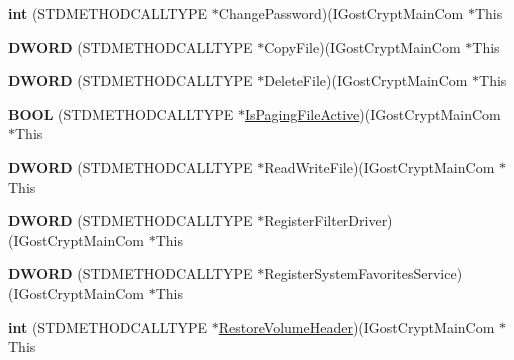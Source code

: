 \begin{DoxyCompactItemize}
{\bfseries int} (S\+T\+D\+M\+E\+T\+H\+O\+D\+C\+A\+L\+L\+T\+Y\+PE $\ast$Change\+Password)(I\+Gost\+Crypt\+Main\+Com $\ast$This
\item 
\mbox{\label{struct_i_gost_crypt_main_com_vtbl_a213c1d206762606814a94a75a89e5355}} 
{\bfseries D\+W\+O\+RD} (S\+T\+D\+M\+E\+T\+H\+O\+D\+C\+A\+L\+L\+T\+Y\+PE $\ast$Copy\+File)(I\+Gost\+Crypt\+Main\+Com $\ast$This
\item 
\mbox{\label{struct_i_gost_crypt_main_com_vtbl_a902bda4ac17a6bae0eb9a6160a0cc954}} 
{\bfseries D\+W\+O\+RD} (S\+T\+D\+M\+E\+T\+H\+O\+D\+C\+A\+L\+L\+T\+Y\+PE $\ast$Delete\+File)(I\+Gost\+Crypt\+Main\+Com $\ast$This
\item 
\mbox{\label{struct_i_gost_crypt_main_com_vtbl_a66d49597b936e6bbc66a2c908420f16e}} 
{\bfseries B\+O\+OL} (S\+T\+D\+M\+E\+T\+H\+O\+D\+C\+A\+L\+L\+T\+Y\+PE $\ast$\hyperlink{_dlgcode_8c_a4683f63544f31aee5130df039402b772}{Is\+Paging\+File\+Active})(I\+Gost\+Crypt\+Main\+Com $\ast$This
\item 
\mbox{\label{struct_i_gost_crypt_main_com_vtbl_ac743d9af8b632a110dd2a480b5982cb3}} 
{\bfseries D\+W\+O\+RD} (S\+T\+D\+M\+E\+T\+H\+O\+D\+C\+A\+L\+L\+T\+Y\+PE $\ast$Read\+Write\+File)(I\+Gost\+Crypt\+Main\+Com $\ast$This
\item 
\mbox{\label{struct_i_gost_crypt_main_com_vtbl_a20aadacbb8e01fd606e977229c2f47eb}} 
{\bfseries D\+W\+O\+RD} (S\+T\+D\+M\+E\+T\+H\+O\+D\+C\+A\+L\+L\+T\+Y\+PE $\ast$Register\+Filter\+Driver)(I\+Gost\+Crypt\+Main\+Com $\ast$This
\item 
\mbox{\label{struct_i_gost_crypt_main_com_vtbl_a7efe35a02bbc6a00f3df26f3a1892c00}} 
{\bfseries D\+W\+O\+RD} (S\+T\+D\+M\+E\+T\+H\+O\+D\+C\+A\+L\+L\+T\+Y\+PE $\ast$Register\+System\+Favorites\+Service)(I\+Gost\+Crypt\+Main\+Com $\ast$This
\item 
\mbox{\label{struct_i_gost_crypt_main_com_vtbl_ad5e1c0fb90636886327a47e9f0cbe92c}} 
{\bfseries int} (S\+T\+D\+M\+E\+T\+H\+O\+D\+C\+A\+L\+L\+T\+Y\+PE $\ast$\hyperlink{_mount_8c_a6d8d4c146bfd307abfb93dfb9b03c335}{Restore\+Volume\+Header})(I\+Gost\+Crypt\+Main\+Com $\ast$This

\end{DoxyCompactItemize}
